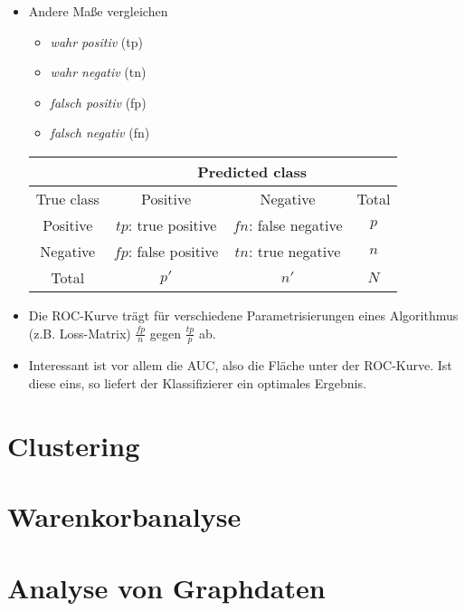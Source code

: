 \documentclass{scrartcl}
\begin{document}
\begin{itemize}
	\item Andere Maße vergleichen 
	\begin{itemize}
		\item \textit{wahr positiv} (tp)
		\item \textit{wahr negativ} (tn)
		\item \textit{falsch positiv} (fp)
		\item \textit{falsch negativ} (fn)
	\end{itemize}
	\begin{tabular}{|c|c|c|c|}
		\hline 
		& \multicolumn{3}{|c|}{Predicted class}  \\ 
		\hline 
		True class & Positive & Negative & Total \\ 
		\hline 
		Positive & $ tp $: true positive & $ fn $: false negative & $ p $ \\ 
		Negative & $ fp $: false positive & $ tn $: true negative & $ n $ \\ 
		\hline 
		Total & $ p' $ & $ n' $ & $ N $ \\ 
		\hline 
	\end{tabular} 
	\item Die ROC-Kurve trägt für verschiedene Parametrisierungen eines 
	Algorithmus (z.B. Loss-Matrix) $ \frac{fp}{n} $ gegen $ \frac{tp}{p} $ ab.
	\item Interessant ist vor allem die AUC, also die Fläche unter der 
	ROC-Kurve. Ist diese eins, so liefert der Klassifizierer ein optimales 
	Ergebnis.
\end{itemize}

\section{Clustering}

\section{Warenkorbanalyse}

\section{Analyse von Graphdaten}
\end{document}
